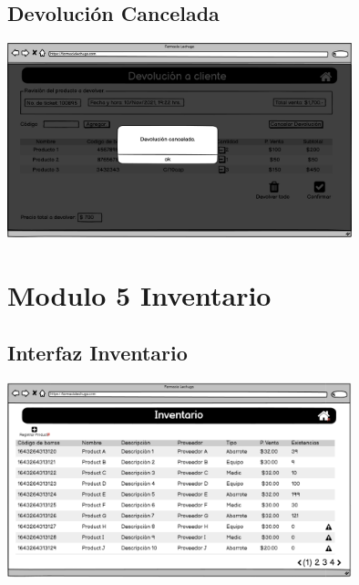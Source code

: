 \begin{flushleft}
	\subsection{Devolución Cancelada} \label{UI: devolucion cancelada}
	\begin{center}
		\includegraphics[width=10cm]{pantallas/images/25devolucioncancelada.png}\\	
		 	
	\end{center}
	\newpage
	\section{Modulo 5 Inventario}
	\subsection{Interfaz Inventario} \label{Interfaz Inventario}
	\begin{center}
		\includegraphics[width=10cm]{pantallas/images/26gestionarinventario.PNG}\\	
		 	
	\end{center}

\end{flushleft}

